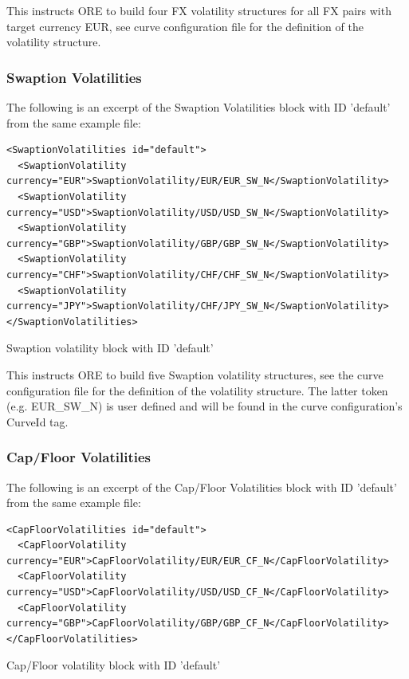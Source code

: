 \documentclass[12pt, a4paper]{article}
\begin{document}
This instructs ORE to build four FX volatility structures for all FX pairs with target currency EUR, see curve
configuration file for the definition of the volatility structure.

\subsubsection{Swaption Volatilities}

The following is an excerpt of the Swaption Volatilities block with ID 'default' from the same example file:

\begin{listing}[H]
\begin{verbatim}
<SwaptionVolatilities id="default">
  <SwaptionVolatility currency="EUR">SwaptionVolatility/EUR/EUR_SW_N</SwaptionVolatility>
  <SwaptionVolatility currency="USD">SwaptionVolatility/USD/USD_SW_N</SwaptionVolatility>
  <SwaptionVolatility currency="GBP">SwaptionVolatility/GBP/GBP_SW_N</SwaptionVolatility>
  <SwaptionVolatility currency="CHF">SwaptionVolatility/CHF/CHF_SW_N</SwaptionVolatility>
  <SwaptionVolatility currency="JPY">SwaptionVolatility/CHF/JPY_SW_N</SwaptionVolatility>
</SwaptionVolatilities>
\end{verbatim}
\caption{Swaption volatility block with ID 'default'}
\label{lst:swaptionvol_spec}
\end{listing}

This instructs ORE to build five Swaption volatility structures, see the curve configuration file for the definition of
the volatility structure. The latter token (e.g. EUR\_SW\_N) is user defined and will be found in the curve
configuration's CurveId tag.

\subsubsection{Cap/Floor Volatilities}

The following is an excerpt of the Cap/Floor Volatilities block with ID 'default' from the same example file:

\begin{listing}[H]
\begin{verbatim}
<CapFloorVolatilities id="default">
  <CapFloorVolatility currency="EUR">CapFloorVolatility/EUR/EUR_CF_N</CapFloorVolatility>
  <CapFloorVolatility currency="USD">CapFloorVolatility/USD/USD_CF_N</CapFloorVolatility>
  <CapFloorVolatility currency="GBP">CapFloorVolatility/GBP/GBP_CF_N</CapFloorVolatility>
</CapFloorVolatilities>
\end{verbatim}
\caption{Cap/Floor volatility block with ID 'default'}
\label{lst:capfloorvol_spec}
\end{listing}
\end{document}
